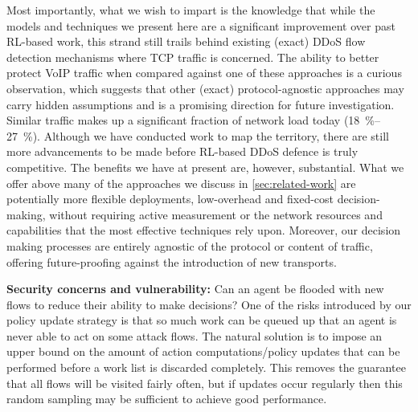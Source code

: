 \documentclass[10pt, times, comsoc]{IEEEtran}
\newcommand{\fakepara}[1]{\noindent\textbf{#1:}}
\begin{document}
\cbstart
{\color{revisiontext}Most importantly, what we wish to impart is the knowledge that while the models and techniques we present here are a significant improvement over past RL-based work, this strand still trails behind existing (exact) DDoS flow detection mechanisms where TCP traffic is concerned.
The ability to better protect VoIP traffic when compared against one of these approaches is a curious observation, which suggests that other (exact) protocol-agnostic approaches may carry hidden assumptions and is a promising direction for future investigation.
Similar traffic makes up a significant fraction of network load today (\SIrange{18}{27}{\percent}).
Although we have conducted work to map the territory, there are still more advancements to be made before RL-based DDoS defence is truly competitive.
The benefits we have at present are, however, substantial.
What we offer above many of the approaches we discuss in \cref{sec:related-work} are potentially more flexible deployments, low-overhead and fixed-cost decision-making, without requiring active measurement or the network resources and capabilities that the most effective techniques rely upon.
Moreover, our decision making processes are entirely agnostic of the protocol or content of traffic, offering future-proofing against the introduction of new transports.}
\cbend

\fakepara{Security concerns and vulnerability}
Can an agent be flooded with new flows to reduce their ability to make decisions?
One of the risks introduced by our policy update strategy is that so much work can be queued up that an agent is never able to act on some attack flows.
The natural solution is to impose an upper bound on the amount of action computations/policy updates that can be performed before a work list is discarded completely.
This removes the guarantee that all flows will be visited fairly often, but if updates occur regularly then this random sampling may be sufficient to achieve good performance.
\end{document}
